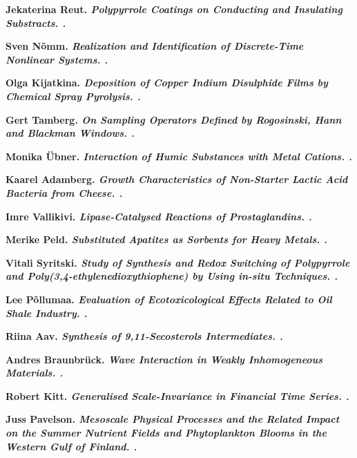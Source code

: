 \begin{list}
\item \bf Jekaterina Reut. \it Polypyrrole Coatings on Conducting and
  Insulating Substracts. .

\item \bf Sven N\~omm. \it Realization and Identification of Discrete-Time
  Nonlinear Systems. .

\item \bf Olga Kijatkina. \it Deposition of Copper Indium Disulphide Films by
  Chemical Spray Pyrolysis. .

\item \bf Gert Tamberg. \it On Sampling Operators Defined by Rogosinski, Hann
  and Blackman Windows. .

\item \bf Monika \"Ubner. \it Interaction of Humic Substances with Metal
  Cations. .

\item \bf Kaarel Adamberg. \it Growth Characteristics of Non-Starter Lactic
  Acid Bacteria from Cheese. .

\item \bf Imre Vallikivi. \it Lipase-Catalysed Reactions of
  Prostaglandins. .

\item \bf Merike Peld. \it Substituted Apatites as Sorbents for Heavy
  Metals. .

\item \bf Vitali Syritski. \it Study of Synthesis and Redox Switching of
  Polypyrrole and Poly(3,4-ethylenedioxythiophene) by Using in-situ
  Techniques. .

\item \bf Lee P\~ollumaa. \it Evaluation of Ecotoxicological Effects Related
  to Oil Shale Industry. .

\item \bf Riina Aav. \it Synthesis of 9,11-Secosterols Intermediates. .

\item \bf Andres Braunbr\"uck. \it Wave Interaction in Weakly Inhomogeneous
  Materials. .

\item \bf Robert Kitt. \it Generalised Scale-Invariance in Financial Time
  Series. .

\item \bf Juss Pavelson. \it Mesoscale Physical Processes and the Related
  Impact on the Summer Nutrient Fields and Phytoplankton Blooms in the
  Western Gulf of Finland. .


\end{list}
